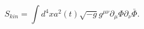 \begin{equation}
S_{kin}=\int d^4x a^2(t) \sqrt {-g} g^{\mu\nu}\partial_\mu \Phi \partial_\nu \bar \Phi.
\end{equation}

